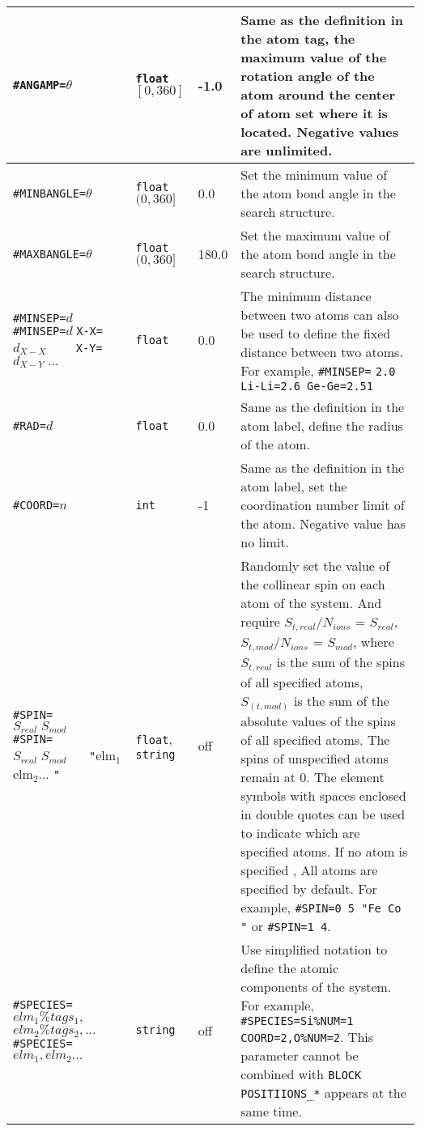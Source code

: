 \documentclass[a4paper, 10pt]{article}
\begin{document}
\begin{center}
\begin{longtable}{m{11em}|m{4em}<{\centering}|m{3em}<{\centering}|m{15em}}
\midrule
\verb|#ANGAMP=|\(\theta\)& \verb|float| \([0,360]\) & -1.0 & Same as the definition in the atom tag, the maximum value of the rotation angle of the atom around the center of \textbf{atom set} where it is located. Negative values are unlimited.\\
\midrule
\verb|#MINBANGLE=|\(\theta\) & \verb|float| \((0,360]\) & 0.0 & Set the minimum value of the atom bond angle in the search structure.\\
\midrule
\verb|#MAXBANGLE=|\(\theta\) & \verb|float| \((0,360]\) & 180.0 & Set the maximum value of the atom bond angle in the search structure.\\
\midrule
\verb|#MINSEP=|\(d\) \verb|#MINSEP=|\(d\;\)\verb|X-X=|\(d_{X−X}\;\)\ \ \  \ \verb|X-Y=|\(d_{X−Y}\;...\) & \verb|float| & 0.0 & The minimum distance between two atoms can also be used to define the fixed distance between two atoms. For example, \verb|#MINSEP=| \verb|2.0 Li-Li=2.6 Ge-Ge=2.51|\\
\midrule
\verb|#RAD=|\(d\)& \verb|float|  & 0.0 & Same as the definition in the atom label, define the radius of the atom.\\
\midrule
\verb|#COORD=|\(n\)& \verb|int| & -1 & Same as the definition in the atom label, set the coordination number limit of the atom. Negative value has no limit.\\
\midrule
\verb|#SPIN=|\(S_{real}\;S_{mod}\;\;\;\;\;\;\) \verb|#SPIN=|\(S_{real}\;S_{mod}\;\;\;\;\;\) \verb|"|elm\(_1\) elm\(_2\)... \verb|"| & \verb|float|,  \verb|string|& off & Randomly set the value of the collinear spin on each atom of the system. And require \(S_{t,real}\)/\(N_{ions}\) = \(S_{real}\), \(S_{ t,mod}\)/\(N_{ions}\) = \(S_{mod}\), where \(S_{t,real}\) is the sum of the spins of all specified atoms, \(S_(t ,mod)\) is the sum of the absolute values of the spins of all specified atoms. The spins of unspecified atoms remain at 0. The element symbols with spaces enclosed in double quotes can be used to indicate which are specified atoms. If no atom is specified , All atoms are specified by default. For example, \verb|#SPIN=0 5 "Fe Co "| or \verb|#SPIN=1 4|. \\
\midrule
\verb|#SPECIES=|\(elm_1\%tags_1,\) \(elm_2\%tags_2,...\;\;\;\;\;\;\) \verb|#SPECIES=|\(elm_1,elm_2...\) & \verb|string|  & off & Use simplified notation to define the atomic components of the system. For example, \verb|#SPECIES=Si|\verb|%NUM=1| \verb|COORD=2,|\verb|O%NUM=2|. This parameter cannot be combined with \verb|BLOCK POSITIIONS_*| appears at the same time.\\

\end{longtable}
\end{center}
\end{document}
